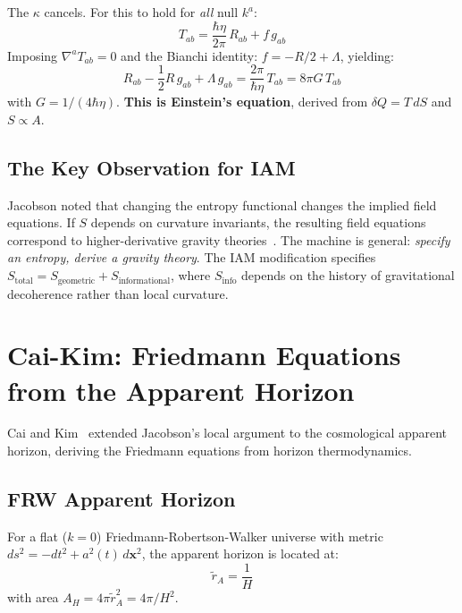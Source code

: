 \documentclass[aps,prd,twocolumn,superscriptaddress,nofootinbib]{revtex4-2}
\begin{document}
The $\kappa$ cancels. For this to hold for \textit{all} null $k^a$:
\begin{equation}
T_{ab} = \frac{\hbar\eta}{2\pi}\,R_{ab} + f\,g_{ab}
\end{equation}
Imposing $\nabla^a T_{ab} = 0$ and the Bianchi identity: $f = -R/2 + \Lambda$, yielding:
\begin{equation}
R_{ab} - \frac{1}{2}R\,g_{ab} + \Lambda\,g_{ab} = \frac{2\pi}{\hbar\eta}\,T_{ab} = 8\pi G\,T_{ab}
\label{eq:einstein}
\end{equation}
with $G = 1/(4\hbar\eta)$. \textbf{This is Einstein's equation}, derived from $\delta Q = T\,dS$ and $S \propto A$.

\subsection{The Key Observation for IAM}

Jacobson noted that changing the entropy functional changes the implied field equations. If $S$ depends on curvature invariants, the resulting field equations correspond to higher-derivative gravity theories~\cite{Jacobson1995}. The machine is general: \textit{specify an entropy, derive a gravity theory}. The IAM modification specifies $S_\text{total} = S_\text{geometric} + S_\text{informational}$, where $S_\text{info}$ depends on the history of gravitational decoherence rather than local curvature.

\section{Cai-Kim: Friedmann Equations from the Apparent Horizon}
\label{sec:caikim}

Cai and Kim~\cite{Cai2005} extended Jacobson's local argument to the cosmological apparent horizon, deriving the Friedmann equations from horizon thermodynamics.

\subsection{FRW Apparent Horizon}

For a flat ($k = 0$) Friedmann-Robertson-Walker universe with metric $ds^2 = -dt^2 + a^2(t)\,d\mathbf{x}^2$, the apparent horizon is located at:
\begin{equation}
\tilde{r}_A = \frac{1}{H}
\label{eq:rA}
\end{equation}
with area $A_H = 4\pi\tilde{r}_A^2 = 4\pi/H^2$.
\end{document}
